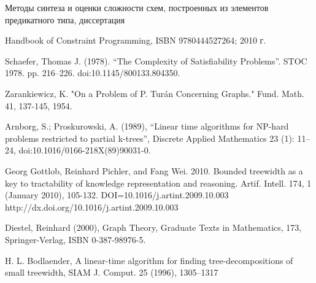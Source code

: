\documentclass[12pt]{article}
\begin{document}
Методы синтеза и оценки сложности схем, построенных из элементов предикатного типа, диссертация

 Handbook of Constraint Programming, ISBN 9780444527264; 2010 г.

 Schaefer, Thomas J. (1978). 
``The Complexity of Satisfiability Problems''. STOC 1978. pp. 216–226. doi:10.1145/800133.804350.

 Zarankiewicz, K. "On a Problem of P. Turán Concerning Graphs." Fund. Math. 41, 137-145, 1954. 

 Arnborg, S.; Proskurowski, A. (1989), 
``Linear time algorithms for NP-hard problems restricted to partial k-trees'',
Discrete Applied Mathematics 23 (1): 11–24, doi:10.1016/0166-218X(89)90031-0.

Georg Gottlob, Reinhard Pichler, and Fang Wei. 2010. Bounded treewidth as a key to tractability of knowledge representation and reasoning. Artif. Intell. 174, 1 (January 2010), 105-132. DOI=10.1016/j.artint.2009.10.003 http://dx.doi.org/10.1016/j.artint.2009.10.003

Diestel, Reinhard (2000), Graph Theory, Graduate Texts in Mathematics, 
173, Springer-Verlag, ISBN 0-387-98976-5.

H. L. Bodlaender, A linear-time algorithm for finding 
tree-decompositions of small
treewidth, SIAM J. Comput. 25 (1996), 1305–1317


\endthebibliography
\end{document}

